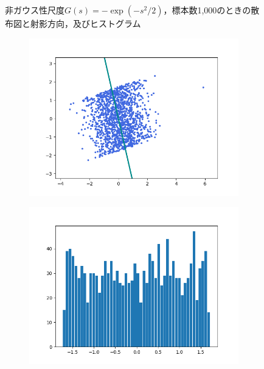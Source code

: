 \documentclass[class=jsarticle, crop=false, dvipdfmx, fleqn]{standalone}
\begin{document}
\begin{figure}
\begin{minipage}{0.45\linewidth}
\begin{figure}[H]
            \label{fig:exp_n1000_hist}
        \end{figure}
    \end{minipage}
    \caption{非ガウス性尺度\(G(s) = -\exp(-s^2/2)\)，標本数1,000のときの散布図と射影方向，及びヒストグラム}
    \label{fig:exp_n1000}
\end{figure}

\begin{figure}
	\centering
    \begin{minipage}{0.45\linewidth}
        \begin{figure}[H]
        	   \centering
            \includegraphics[clip, width=\linewidth]{../figures/assignment2_result_exp_n1500_scatter.png}
            \label{fig:exp_n1500_scatter}
        \end{figure}
    \end{minipage}
    \begin{minipage}{0.45\linewidth}
        \begin{figure}[H]
            \centering
            \includegraphics[clip, width=\linewidth]{../figures/assignment2_result_exp_n1500_hist.png}

\end{figure}
\end{minipage}
\end{figure}
\end{document}
